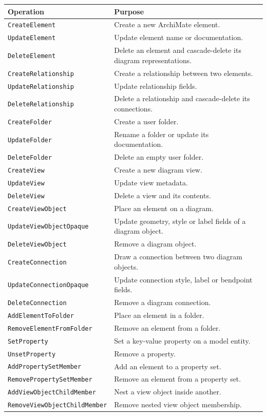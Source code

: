 \begin{longtable}{p{52mm}p{102mm}}
\toprule
Operation & Purpose \\
\midrule
\texttt{CreateElement} & Create a new ArchiMate element. \\
\texttt{UpdateElement} & Update element name or documentation. \\
\texttt{DeleteElement} & Delete an element and cascade-delete its
  diagram representations. \\
\texttt{CreateRelationship} & Create a relationship between two elements. \\
\texttt{UpdateRelationship} & Update relationship fields. \\
\texttt{DeleteRelationship} & Delete a relationship and cascade-delete
  its connections. \\
\texttt{CreateFolder} & Create a user folder. \\
\texttt{UpdateFolder} & Rename a folder or update its documentation. \\
\texttt{DeleteFolder} & Delete an empty user folder. \\
\texttt{CreateView} & Create a new diagram view. \\
\texttt{UpdateView} & Update view metadata. \\
\texttt{DeleteView} & Delete a view and its contents. \\
\texttt{CreateViewObject} & Place an element on a diagram. \\
\texttt{UpdateViewObjectOpaque} & Update geometry, style or label fields
  of a diagram object. \\
\texttt{DeleteViewObject} & Remove a diagram object. \\
\texttt{CreateConnection} & Draw a connection between two diagram objects. \\
\texttt{UpdateConnectionOpaque} & Update connection style, label or
  bendpoint fields. \\
\texttt{DeleteConnection} & Remove a diagram connection. \\
\texttt{AddElementToFolder} & Place an element in a folder. \\
\texttt{RemoveElementFromFolder} & Remove an element from a folder. \\
\texttt{SetProperty} & Set a key-value property on a model entity. \\
\texttt{UnsetProperty} & Remove a property. \\
\texttt{AddPropertySetMember} & Add an element to a property set. \\
\texttt{RemovePropertySetMember} & Remove an element from a property set. \\
\texttt{AddViewObjectChildMember} & Nest a view object inside another. \\
\texttt{RemoveViewObjectChildMember} & Remove nested view object membership. \\
\bottomrule
\end{longtable}

